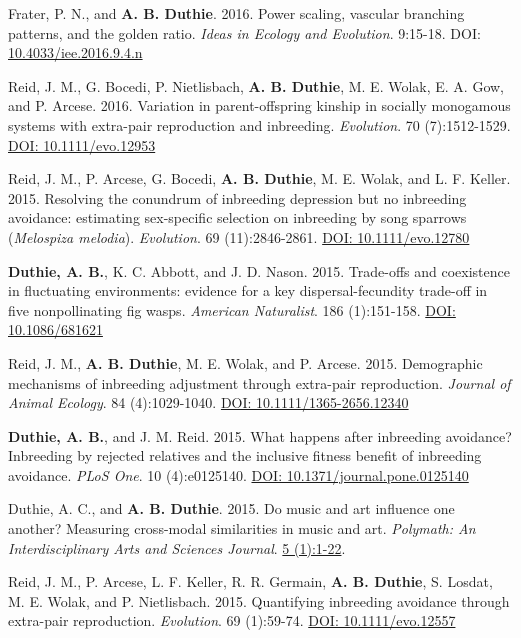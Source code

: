 \documentclass[letterpaper]{article}
\begin{document}
\begin{etaremune}
\item Frater, P. N., and {\bf A. B. Duthie}. 2016. Power scaling, vascular branching patterns, and the golden ratio. {\it Ideas in Ecology and Evolution}. 9:15-18. DOI: \href{http://ojs.library.queensu.ca/index.php/IEE/article/view/6312}{10.4033/iee.2016.9.4.n}
\item Reid, J. M., G. Bocedi, P. Nietlisbach, {\bf A. B. Duthie}, M. E. Wolak, E. A. Gow, and P. Arcese. 2016. Variation in parent-offspring kinship in socially monogamous systems with extra-pair reproduction and inbreeding. {\it Evolution}. 70 (7):1512-1529. \href{http://onlinelibrary.wiley.com/doi/10.1111/evo.12953/abstract}{DOI: 10.1111/evo.12953}
\item Reid, J. M., P. Arcese, G. Bocedi, {\bf A. B. Duthie}, M. E. Wolak, and L. F. Keller. 2015. Resolving the conundrum of inbreeding depression but no inbreeding avoidance: estimating sex-specific selection on inbreeding by song sparrows ({\it Melospiza melodia}). {\it Evolution}. 69 (11):2846-2861. \href{http://onlinelibrary.wiley.com/doi/10.1111/evo.12780/abstract}{DOI: 10.1111/evo.12780}
\item {\bf Duthie, A. B.}, K. C. Abbott, and J. D. Nason. 2015. Trade-offs and coexistence in fluctuating environments: evidence for a key dispersal-fecundity trade-off in five nonpollinating fig wasps. {\it American Naturalist}. 186 (1):151-158. \href{http://www.jstor.org/stable/10.1086/681621}{DOI: 10.1086/681621}
\item Reid, J. M., {\bf A. B. Duthie}, M. E. Wolak, and P. Arcese. 2015. Demographic mechanisms of inbreeding adjustment through extra-pair reproduction. {\it Journal of Animal Ecology}. 84 (4):1029-1040. \href{http://onlinelibrary.wiley.com/doi/10.1111/1365-2656.12340/abstract}{DOI: 10.1111/1365-2656.12340}
\item {\bf Duthie, A. B.}, and J. M. Reid. 2015. What happens after inbreeding avoidance? Inbreeding by rejected relatives and the inclusive fitness benefit of inbreeding avoidance. {\it PLoS One}. 10 (4):e0125140. \href{http://journals.plos.org/plosone/article?id=10.1371/journal.pone.0125140}{DOI: 10.1371/journal.pone.0125140}
\item Duthie, A. C., and {\bf A. B. Duthie}. 2015. Do music and art influence one another? Measuring cross-modal similarities in music and art. {\it Polymath: An Interdisciplinary Arts and Sciences Journal}. \href{https://ojcs.siue.edu/ojs/index.php/polymath/article/view/3013}{5 (1):1-22}.
\item Reid, J. M., P. Arcese, L. F. Keller, R. R. Germain, {\bf A. B. Duthie}, S. Losdat, M. E. Wolak, and P. Nietlisbach. 2015. Quantifying inbreeding avoidance through extra-pair reproduction. {\it Evolution}. 69 (1):59-74. \href{http://onlinelibrary.wiley.com/doi/10.1111/evo.12557/abstract}{DOI: 10.1111/evo.12557}

\end{etaremune}
\end{document}
